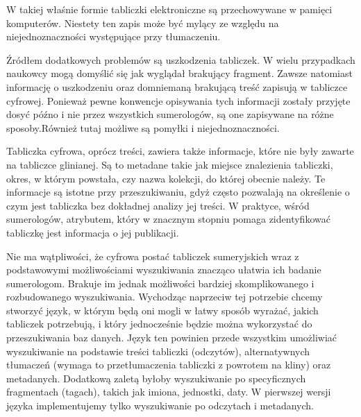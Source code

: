 W takiej właśnie formie tabliczki elektroniczne są przechowywane w pamięci komputerów. 
Niestety ten zapis może być mylący ze względu na niejednoznaczności występujące przy tłumaczeniu. 

Źródłem dodatkowych problemów są uszkodzenia tabliczek. 
W wielu przypadkach naukowcy mogą domyślić się jak wyglądał brakujący fragment. 
Zawsze natomiast informację o uszkodzeniu oraz domniemaną brakującą treść zapisują w tabliczce cyfrowej.
Ponieważ pewne konwencje opisywania tych informacji zostały przyjęte dosyć późno i nie przez wszystkich sumerologów, 
są one zapisywane na różne sposoby.Również tutaj możliwe są pomyłki i niejednoznaczności.

Tabliczka cyfrowa, oprócz treści, zawiera także informacje, które nie były zawarte na tabliczce glinianej. 
Są to metadane takie jak miejsce znalezienia tabliczki, okres, w którym powstała, czy nazwa kolekcji, do której obecnie należy. 
Te informacje są istotne przy przeszukiwaniu, gdyż często pozwalają na określenie o czym jest tabliczka bez dokładnej analizy 
jej treści. 
W praktyce, wśród sumerologów, atrybutem, który w znacznym stopniu pomaga zidentyfikować tabliczkę jest informacja o jej publikacji.

Nie ma wątpliwości, że cyfrowa postać tabliczek sumeryjskich wraz z podstawowymi możliwościami wyszukiwania znacząco
ułatwia ich badanie sumerologom. Brakuje im jednak możliwości bardziej skomplikowanego i rozbudowanego wyszukiwania.
Wychodząc naprzeciw tej potrzebie chcemy stworzyć język, w którym będą oni mogli w łatwy sposób wyrażać, 
jakich tabliczek potrzebują, i który jednocześnie będzie można wykorzystać do przeszukiwania baz danych. 
Język ten powinien przede wszystkim umożliwiać wyszukiwanie na podstawie treści tabliczki (odczytów), 
alternatywnych tłumaczeń (wymaga to przetłumaczenia tabliczki z powrotem na kliny) oraz metadanych.
Dodatkową zaletą byłoby wyszukiwanie po specyficznych fragmentach (tagach), takich jak imiona, jednostki, daty.
W pierwszej wersji języka implementujemy tylko wyszukiwanie po odczytach i metadanych.
